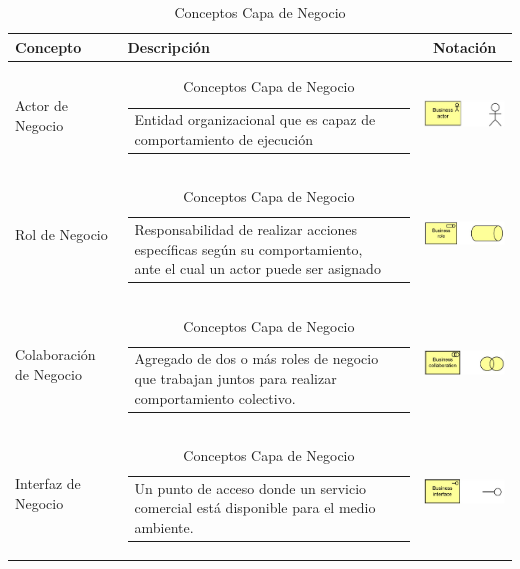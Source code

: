 \begin{longtable}[c]{|p{2.5cm}|l|c|}
	\caption{Conceptos Capa de Negocio}
	\label{my-label}\\
	\hline
	\textbf{Concepto} 			& \textbf{Descripción}                                                                                                                                            & \textbf{Notación} \\ \hline
	\endhead
	Actor de Negocio  			& \begin{tabular}[c]{p{7cm}@{}l@{}}Entidad organizacional que es capaz de comportamiento de ejecución\end{tabular}                                                    & \includegraphics[width=35mm]{arquitectura/adm_lenguaje/imgs/business/BusinessActor}           \\ \hline
	Rol de Negocio    			& \begin{tabular}[c]{p{7cm}@{}l@{}}Responsabilidad de realizar acciones específicas según su comportamiento, ante el cual un actor puede ser asignado\end{tabular} & \includegraphics[width=35mm]{arquitectura/adm_lenguaje/imgs/business/BusinessRole}          \\ \hline
	Colaboración de Negocio  	& \begin{tabular}[c]{p{7cm}@{}l@{}}Agregado de dos o más roles de negocio que trabajan juntos para realizar comportamiento colectivo.\end{tabular} & \includegraphics[width=35mm]{arquitectura/adm_lenguaje/imgs/business/BusinessCollaboration}          \\ \hline
	Interfaz de Negocio    		& \begin{tabular}[c]{p{7cm}@{}l@{}}Un punto de acceso donde un servicio comercial está disponible para el medio ambiente.\end{tabular} & \includegraphics[width=35mm]{arquitectura/adm_lenguaje/imgs/business/BusinessInterface}          \\ \hline

\end{longtable}
